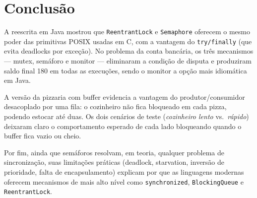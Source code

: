 \section{Conclusão}

A reescrita em Java mostrou que \texttt{ReentrantLock} e \texttt{Semaphore}
oferecem o mesmo poder das primitivas POSIX usadas em C, com a vantagem
do \texttt{try/finally} (que evita deadlocks por exceção). No problema da
conta bancária, os três mecanismos --- mutex, semáforo e monitor ---
eliminaram a condição de disputa e produziram saldo final 180 em todas as
execuções, sendo o monitor a opção mais idiomática em Java.

A versão da pizzaria com buffer evidencia a vantagem do produtor/consumidor
desacoplado por uma fila: o cozinheiro não fica bloqueado em cada pizza,
podendo estocar até duas. Os dois cenários de teste (\textit{cozinheiro
lento} vs.\ \textit{rápido}) deixaram claro o comportamento esperado de
cada lado bloqueando quando o buffer fica vazio ou cheio.

Por fim, ainda que semáforos resolvam, em teoria, qualquer problema de
sincronização, suas limitações práticas (deadlock, starvation, inversão de
prioridade, falta de encapsulamento) explicam por que as linguagens
modernas oferecem mecanismos de mais alto nível como
\texttt{synchronized}, \texttt{BlockingQueue} e \texttt{ReentrantLock}.
